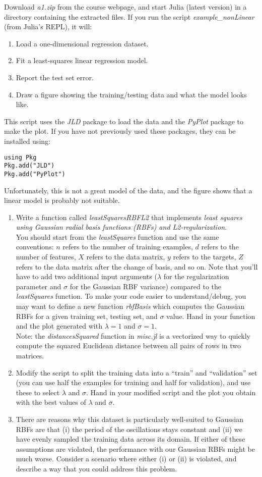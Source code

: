 \documentclass{article}
\def\blu#1{{\color{blu}#1}}
\def\enum#1{\begin{enumerate}#1\end{enumerate}}
\begin{document}
Download \emph{a1.zip} from the course webpage, and start Julia (latest version) in a directory containing the extracted files. If you run the script \emph{example\_nonLinear} (from Julia's REPL), it will:
\enum{
\item Load a one-dimensional regression dataset.
\item Fit a least-squares linear regression model.
\item Report the test set error.
\item Draw a figure showing the training/testing data and what the model looks like.
}
This script uses the \emph{JLD} package to load the data and the \emph{PyPlot} package to make the plot. If you have not previously used these packages, they can be installed using:
\begin{verbatim}
using Pkg
Pkg.add("JLD")
Pkg.add("PyPlot")
\end{verbatim}

Unfortunately, this is not a great model of the data, and the figure shows that a linear model is probably not suitable.
\enum{
\item Write a function called \emph{leastSquaresRBFL2} that implements \emph{least squares using Gaussian radial basis functions (RBFs) and L2-regularization}. \\You should start from the \emph{leastSquares} function and use the same conventions: $n$ refers to the number of training examples, $d$ refers to the number of features, $X$ refers to the data matrix, $y$ refers to the targets, $Z$ refers to the data matrix after the change of basis, and so on. Note that you'll have to add two additional input arguments ($\lambda$ for the regularization parameter and $\sigma$ for the Gaussian RBF variance) compared to the \emph{leastSquares} function. To make your code easier to understand/debug, you may want to define a new function \emph{rbfBasis} which computes the Gaussian RBFs for a given training set, testing set, and $\sigma$ value. \blu{Hand in your function and the plot generated with $\lambda = 1$ and $\sigma = 1$.}\\
Note:  the \emph{distancesSquared} function in \emph{misc.jl} is a vectorized way to quickly compute the squared Euclidean distance between all pairs of rows in two matrices.
\item Modify the script to split the training data into a ``train'' and ``validation'' set (you can use half the examples for training and half for validation), and use these to select $\lambda$ and $\sigma$. \blu{Hand in your modified script and the plot you obtain with the best values of $\lambda$ and $\sigma$.}
\item There are reasons why this dataset is particularly well-suited to Gaussian RBFs are that (i) the period of the oscillations stays constant and (ii) we have evenly sampled the training data across its domain. If either of these assumptions are violated, the performance with our Gaussian RBFs might be much worse.
\blu{Consider a scenario where either (i) or (ii) is violated, and describe a way that you could address this problem.}
}
\end{document}
